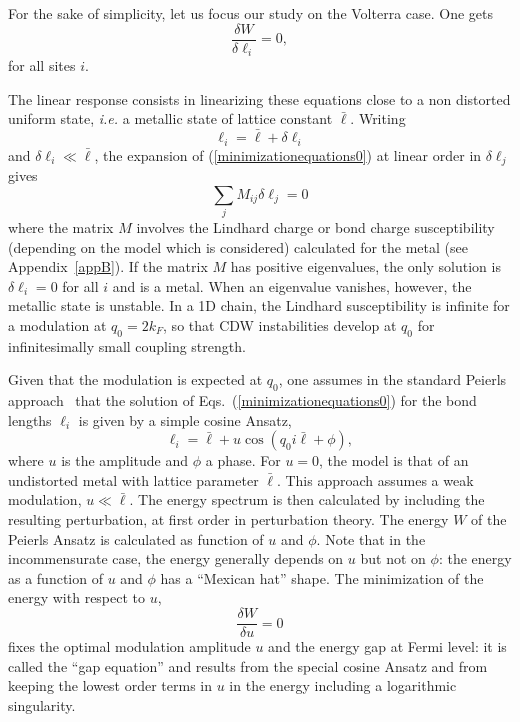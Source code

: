 \documentclass[]{revtex4-1}
\begin{document}
For the sake of simplicity, let us focus our study on the Volterra case. One gets
\begin{equation}
 \frac{\delta W}{\delta \ell_i} =0, \label{minimizationequations0}
\end{equation}
for all sites $i$. 

The linear response consists in linearizing these equations close to a non distorted uniform state, \textit{i.e.} a metallic state of lattice constant $\bar{\ell}$. Writing
\begin{equation} \ell_i=\bar{\ell}+\delta \ell_i \end{equation} and $\delta \ell_i \ll \bar{\ell}$, the  expansion of (\ref{minimizationequations0}) at linear order in $\delta \ell_j$ gives
\begin{equation}
\sum_j M_{ij} \delta \ell_j=0
  \end{equation}
where the matrix $M$ involves the Lindhard charge or bond charge susceptibility (depending on the model which is considered) calculated for the metal (see Appendix~\ref{appB}). If the matrix $M$ has positive eigenvalues, the only solution is $\delta \ell_i=0$ for all $i$ and is a metal. When an eigenvalue vanishes, however, the metallic state is unstable. In a 1D chain, the Lindhard susceptibility is infinite for a modulation at $q_0=2k_F$, so that CDW instabilities develop at $q_0$ for infinitesimally small coupling strength.

 Given that the modulation is expected at $q_0$, one  assumes in the standard Peierls approach~\cite{toombs,gruner_zettl} that the solution of Eqs.~(\ref{minimizationequations0}) for the bond lengths $\ell_i$ is given by a simple cosine Ansatz,
\begin{equation} \ell_i= \bar{\ell}+u \cos (q_0 i \bar{\ell}+ \phi),  \label{Peierlsansatz} \end{equation}
where $u$ is the amplitude and $\phi$ a phase. For $u=0$, the model is that of an undistorted metal with lattice parameter $\bar{\ell}$. This approach assumes a weak modulation, $ u \ll \bar{\ell}$.  The energy spectrum is then calculated by including the resulting perturbation, at first order in perturbation theory. The energy $W$ of the Peierls Ansatz is calculated as function of $u$ and $\phi$. Note that in the incommensurate case, the energy generally depends on $u$ but not on $\phi$: the energy as a function of $u$ and $\phi$ has a ``Mexican hat'' shape. The minimization of the energy with respect to $u$, \begin{equation} \frac{\delta W}{\delta u} =0 \label{gapeqPeierls} \end{equation} fixes the optimal modulation amplitude $u$ and the energy gap at Fermi level: it is called the ``gap equation'' and results from the special cosine Ansatz and from keeping the lowest order terms in $u$ in the energy including a logarithmic singularity.
\end{document}
